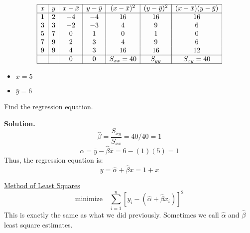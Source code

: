 \begin{exbox}
    \begin{example}
        \[
            \begin{array}{|c|c|c|c|c|c|c|}
                \hline
                x & y & x-\bar{x} & y-\bar{y} & (x-\bar{x})^2 & (y-\bar{y})^2 & (x-\bar{x})(y-\bar{y}) \\
                \hline
                1 & 2 & -4        & -4        & 16            & 16            & 16                     \\
                3 & 3 & -2        & -3        & 4             & 9             & 6                      \\
                5 & 7 & 0         & 1         & 0             & 1             & 0                      \\
                7 & 9 & 2         & 3         & 4             & 9             & 6                      \\
                9 & 9 & 4         & 3         & 16            & 16            & 12                     \\
                \hline
                  &   & 0         & 0         & S_{xx}=40     & S_{yy}        & S_{xy}= 40             \\
                \hline
            \end{array}
        \]
        \begin{itemize}
            \item $ \bar{x} = 5 $
            \item $ \bar{y} = 6 $
        \end{itemize}
        Find the regression equation.

        \textbf{Solution.}
        \[ \hat{\beta}=\frac{S_{xy}}{S_{xx}}=40/40=1  \]
        \[ \hat{\alpha}=\bar{y}-\hat{\beta}\bar{x}=6-(1)(5)=1 \]
        Thus, the regression equation is:
        \[ y=\hat{\alpha}+\hat{\beta}x=1+x \]
    \end{example}
\end{exbox}

\underline{Method of Least Squares}
\[ \text{minimize}\quad \sum\limits_{i=1}^{n} \left[ y_i-(\hat{\alpha}+\hat{\beta}x_i) \right]^2 \]
This is exactly the same as what we did previously. Sometimes we call
$ \hat{\alpha} $ and $ \hat{\beta} $ least square estimates.

